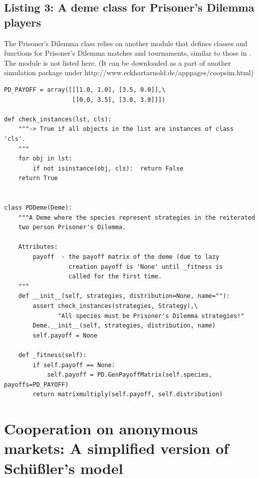 \subsection{Listing 3: A deme class for Prisoner's Dilemma players}
\label{pddeme}

The Prisoner's Dilemma class relies on another module that defines classes and
functions for Prisoner's Dilemma matches and tournaments, similar to those in
\cite{axelrod:1984}. The module is not listed here. (It can be downloaded as a
part of another simulation package
under http://www.eckhartarnold.de/apppages/coopsim.html)

\begin{scriptsize}
\begin{verbatim}
PD_PAYOFF = array([[[1.0, 1.0], [3.5, 0.0]],\
                   [[0.0, 3.5], [3.0, 3.0]]])

def check_instances(lst, cls):
    """-> True if all objects in the list are instances of class 'cls'.
    """
    for obj in lst:
        if not isinstance(obj, cls):  return False
    return True


class PDDeme(Deme):
    """A Deme where the species represent strategies in the reiterated
    two person Prisoner's Dilemma.

    Attributes:
        payoff  - the payoff matrix of the deme (due to lazy
                  creation payoff is 'None' until _fitness is
                  called for the first time.
    """
    def __init__(self, strategies, distribution=None, name=""):
        assert check_instances(strategies, Strategy),\
               "All species must be Prisoner's Dilemma strategies!"
        Deme.__init__(self, strategies, distribution, name)
        self.payoff = None

    def _fitness(self):
        if self.payoff == None:
            self.payoff = PD.GenPayoffMatrix(self.species, payoffs=PD_PAYOFF)
        return matrixmultiply(self.payoff, self.distribution)
\end{verbatim}
\end{scriptsize}

\newpage
\section{Cooperation on anonymous markets: A simplified version of Schüßler's
model}
\label{schuessler}

